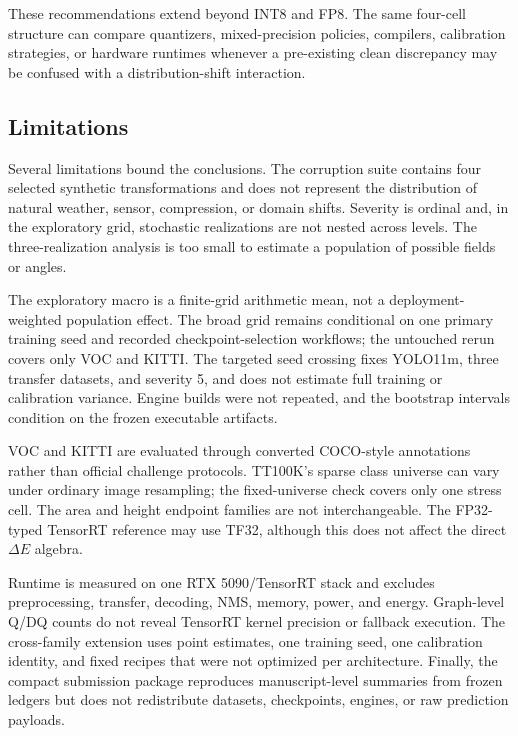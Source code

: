 These recommendations extend beyond INT8 and FP8. The same four-cell structure
can compare quantizers, mixed-precision policies, compilers, calibration
strategies, or hardware runtimes whenever a pre-existing clean discrepancy may
be confused with a distribution-shift interaction.

\subsection{Limitations}

Several limitations bound the conclusions. The corruption suite contains four
selected synthetic transformations and does not represent the distribution of
natural weather, sensor, compression, or domain shifts. Severity is ordinal and,
in the exploratory grid, stochastic realizations are not nested across levels.
The three-realization analysis is too small to estimate a population of possible
fields or angles.

The exploratory macro is a finite-grid arithmetic mean, not a deployment-
weighted population effect. The broad grid remains conditional on one primary
training seed and recorded checkpoint-selection workflows; the untouched rerun
covers only VOC and KITTI. The targeted seed crossing fixes YOLO11m, three
transfer datasets, and severity 5, and does not estimate full training or
calibration variance. Engine builds were not repeated, and the bootstrap
intervals condition on the frozen executable artifacts.

VOC and KITTI are evaluated through converted COCO-style annotations rather
than official challenge protocols. TT100K's sparse class universe can vary
under ordinary image resampling; the fixed-universe check covers only one stress
cell. The area and height endpoint families are not interchangeable. The
FP32-typed TensorRT reference may use TF32, although this does not affect the
direct $\Delta E$ algebra.

Runtime is measured on one RTX 5090/TensorRT stack and excludes preprocessing,
transfer, decoding, NMS, memory, power, and energy. Graph-level Q/DQ counts do
not reveal TensorRT kernel precision or fallback execution. The cross-family
extension uses point estimates, one training seed, one calibration identity,
and fixed recipes that were not optimized per architecture. Finally, the
compact submission package reproduces manuscript-level summaries from frozen
ledgers but does not redistribute datasets, checkpoints, engines, or raw
prediction payloads.
